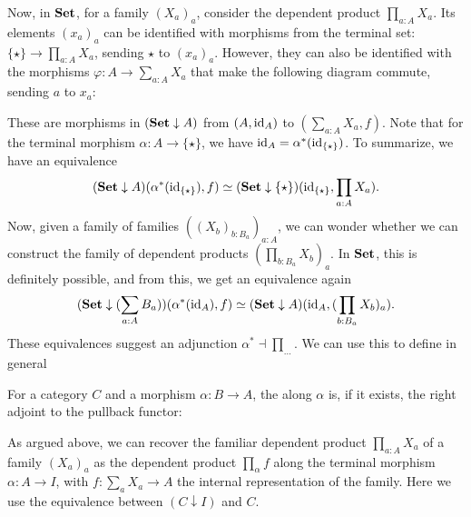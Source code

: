 Now, in $ \mathbf{Set} $, for a family $ (X_a)_a $, consider the dependent product $ \prod_{a : A} X_a $. Its elements $ (x_a)_a $ can be identified with morphisms from the terminal set: $ \{ \star \} \to \prod_{a : A} X_a $, sending $ \star $ to $ (x_a)_a $. However, they can also be identified with the morphisms $ \varphi: A \to \sum_{a : A} X_a $ that make the following diagram commute, sending $ a $ to $ x_a $:
\begin{center}
\end{center}
These are morphisms in $ (\mathbf{Set} \downarrow A) $ from $ (A, \text{id}_{A}) $ to $ (\sum_{a : A} X_a, f) $. Note that for the terminal morphism $ \alpha: A \to \{ \star \} $, we have $ \text{id}_{A} = \alpha^*(\text{id}_{\{\star\}}) $. To summarize, we have an equivalence
\[ (\mathbf{Set} \downarrow A)(\alpha^*(\text{id}_{\{\star\}}), f) \simeq (\mathbf{Set} \downarrow {\{\star\}})( \text{id}_{\{ \star \}}, \prod_{a : A} X_a). \]
Now, given a family of families $ ((X_b)_{b : B_a})_{a : A} $, we can wonder whether we can construct the family of dependent products $ (\prod_{b : B_a} X_b)_a $. In $ \mathbf{Set} $, this is definitely possible, and from this, we get an equivalence again
\[ (\mathbf{Set} \downarrow (\sum_{a : A} B_a))(\alpha^*(\text{id}_{A}), f) \simeq (\mathbf{Set} \downarrow A)(\text{id}_{A}, (\prod_{b : B_a} X_b)_a). \]
These equivalences suggest an adjunction $ \alpha^* \dashv \prod_{\dots} $. We can use this to define in general
\begin{definition}
  For a category $ C $ and a morphism $ \alpha: B \to A $, the  along $ \alpha $ is, if it exists, the right adjoint to the pullback functor:
  \begin{center}
  \end{center}
\end{definition}
\begin{remark}
  As argued above, we can recover the familiar dependent product $ \prod_{a : A} X_a $ of a family $ (X_a)_a $ as the dependent product $ \prod_\alpha f $ along the terminal morphism $ \alpha: A \to I $, with $ f: \sum_a X_a \to A $ the internal representation of the family. Here we use the equivalence between $ (C \downarrow I) $ and $ C $.
\end{remark}

